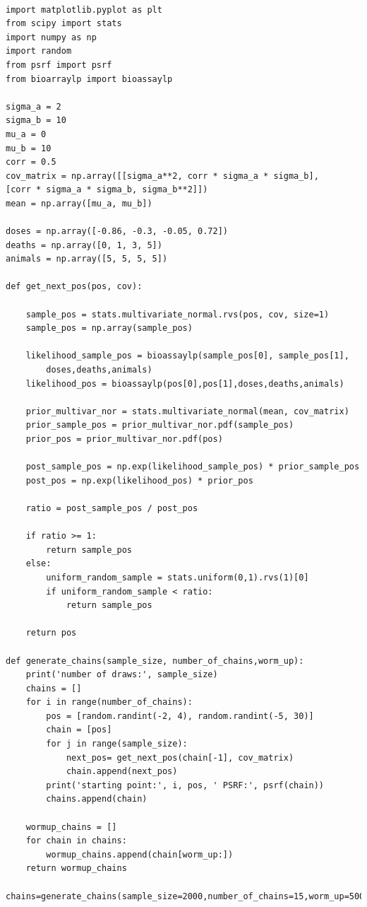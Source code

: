 \documentclass{article}
\begin{document}
\begin{verbatim} 

import matplotlib.pyplot as plt
from scipy import stats
import numpy as np
import random
from psrf import psrf
from bioarraylp import bioassaylp

sigma_a = 2
sigma_b = 10
mu_a = 0
mu_b = 10
corr = 0.5
cov_matrix = np.array([[sigma_a**2, corr * sigma_a * sigma_b], 
[corr * sigma_a * sigma_b, sigma_b**2]])
mean = np.array([mu_a, mu_b])

doses = np.array([-0.86, -0.3, -0.05, 0.72])
deaths = np.array([0, 1, 3, 5])
animals = np.array([5, 5, 5, 5])

def get_next_pos(pos, cov):

    sample_pos = stats.multivariate_normal.rvs(pos, cov, size=1)
    sample_pos = np.array(sample_pos)

    likelihood_sample_pos = bioassaylp(sample_pos[0], sample_pos[1],
    	doses,deaths,animals)
    likelihood_pos = bioassaylp(pos[0],pos[1],doses,deaths,animals)

    prior_multivar_nor = stats.multivariate_normal(mean, cov_matrix)
    prior_sample_pos = prior_multivar_nor.pdf(sample_pos)
    prior_pos = prior_multivar_nor.pdf(pos)

    post_sample_pos = np.exp(likelihood_sample_pos) * prior_sample_pos
    post_pos = np.exp(likelihood_pos) * prior_pos

    ratio = post_sample_pos / post_pos

    if ratio >= 1:
        return sample_pos
    else:
        uniform_random_sample = stats.uniform(0,1).rvs(1)[0]
        if uniform_random_sample < ratio:
            return sample_pos 

    return pos

def generate_chains(sample_size, number_of_chains,worm_up):
    print('number of draws:', sample_size)
    chains = []
    for i in range(number_of_chains):
        pos = [random.randint(-2, 4), random.randint(-5, 30)]
        chain = [pos]
        for j in range(sample_size):
            next_pos= get_next_pos(chain[-1], cov_matrix)
            chain.append(next_pos)
        print('starting point:', i, pos, ' PSRF:', psrf(chain))
        chains.append(chain)

    wormup_chains = []
    for chain in chains:
        wormup_chains.append(chain[worm_up:])
    return wormup_chains
    
chains=generate_chains(sample_size=2000,number_of_chains=15,worm_up=500)


\end{verbatim}
\end{document}
